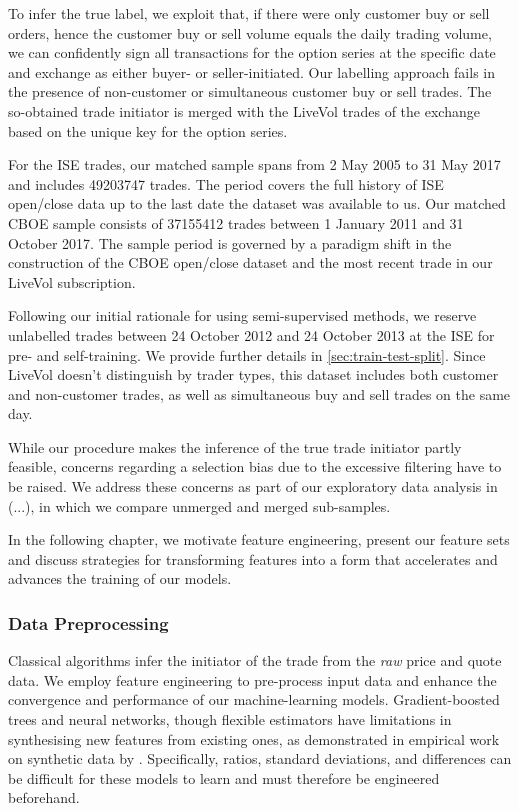 To infer the true label, we exploit that, if there were only customer buy or sell orders, hence the customer buy or sell volume equals the daily trading volume, we can confidently sign all transactions for the option series at the specific date and exchange as either buyer- or seller-initiated. Our labelling approach fails in the presence of non-customer or simultaneous customer buy or sell trades. The so-obtained trade initiator is merged with the LiveVol trades of the exchange based on the unique key for the option series.

For the \gls{ISE} trades, our matched sample spans from 2 May 2005 to 31 May 2017 and includes \num{49203747} trades. The period covers the full history of \gls{ISE} open/close data up to the last date the dataset was available to us. Our matched \gls{CBOE} sample consists of \num{37155412} trades between 1 January 2011 and 31 October 2017. The sample period is governed by a paradigm shift in the construction of the \gls{CBOE} open/close dataset and the most recent trade in our LiveVol subscription.

Following our initial rationale for using semi-supervised methods, we reserve unlabelled trades between 24 October 2012 and 24 October 2013 at the \gls{ISE} for pre- and self-training. We provide further details in \cref{sec:train-test-split}. Since LiveVol doesn't distinguish by trader types, this dataset includes both customer and non-customer trades, as well as simultaneous buy and sell trades on the same day.

While our procedure makes the inference of the true trade initiator partly feasible, concerns regarding a selection bias due to the excessive filtering have to be raised. We address these concerns as part of our exploratory data analysis in (...), in which we compare unmerged and merged sub-samples.

In the following chapter, we motivate feature engineering, present our feature sets and discuss strategies for transforming features into a form that accelerates and advances the training of our models.

\subsubsection{Data Preprocessing}\label{sec:data-preprocessing}

Classical algorithms infer the initiator of the trade from the \emph{raw} price and quote data. We employ feature engineering to pre-process input data and enhance the convergence and performance of our machine-learning models. Gradient-boosted trees and neural networks, though flexible estimators have limitations in synthesising new features from existing ones, as demonstrated in empirical work on synthetic data by \textcite[][5--6]{heatonEmpiricalAnalysisFeature2016}. Specifically, ratios, standard deviations, and differences can be difficult for these models to learn and must therefore be engineered beforehand.

